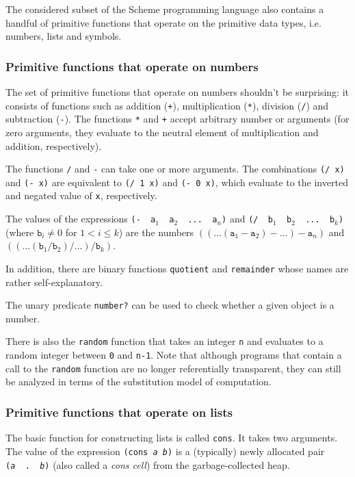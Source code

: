 The considered subset of the Scheme programming language also
contains a handful of primitive functions that operate on the
primitive data types, i.e. numbers, lists and symbols.

\subsubsection{Primitive functions that operate on numbers}

The set of primitive functions that operate on numbers shouldn't
be surprising: it consists of functions such as addition (\texttt{+}),
multiplication (\texttt{*}), division (\texttt{/}) and subtraction
(\texttt{-}). The functions \texttt{*} and \texttt{+} accept
arbitrary number or arguments (for zero arguments, they evaluate
to the neutral element of multiplication and addition, respectively).

The functions \texttt{/} and \texttt{-} can take one or more arguments.
The combinations \texttt{(/ x)} and \texttt{(- x)} are equivalent to
\texttt{(/ 1 x)} and \texttt{(- 0 x)}, which evaluate to the inverted
and negated value of \texttt{x}, respectively.

The values of the expressions \texttt{(-\,\,a$_1$\,\,a$_2$\,\,...\,\,a$_n$)}
and \texttt{(/\,\,b$_1$\,\,b$_2$\,\,...\,\,b$_k$)} (where $\mathtt{b}_i \ne 0$
for $1 < i \le k$) are the numbers
$((... (\mathtt{a}_1 - \mathtt{a}_2) - ...) - \mathtt{a}_n)$
and $((... (\mathtt{b}_1 / \mathtt{b}_2) / ...) / \mathtt{b}_k)$.

In addition, there are binary functions \texttt{quotient} and
\texttt{remainder} whose names are rather self-explanatory.

The unary predicate \texttt{number?} can be used to check whether
a given object is a number.

There is also the \texttt{random} function that takes an integer
\texttt{n} and evaluates to a random integer between \texttt{0}
and \texttt{n-1}. Note that although programs that contain
a call to the \texttt{random} function are no longer referentially
transparent, they can still be analyzed in terms of the substitution
model of computation.

\subsubsection{Primitive functions that operate on lists}

The basic function for constructing lists is called \texttt{cons}.
It takes two arguments. The value of the expression
\texttt{(cons \emph{a} \emph{b})} is a (typically) newly allocated
pair \texttt{(\emph{a}\,\,.\,\,\emph{b})} (also called a
\textit{cons cell}) from the garbage-collected heap.

